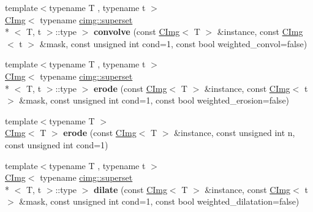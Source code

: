 \begin{DoxyCompactItemize}
\item 
\hypertarget{namespacecimg__library_ac7712bb68aca4c24eea108d6dbde8194}{{\footnotesize template$<$typename T , typename t $>$ }\\\hyperlink{structcimg__library_1_1_c_img}{C\-Img}$<$ typename \hyperlink{structcimg__library_1_1cimg_1_1superset}{cimg\-::superset}\\*
$<$ T, t $>$\-::type $>$ {\bfseries convolve} (const \hyperlink{structcimg__library_1_1_c_img}{C\-Img}$<$ T $>$ \&instance, const \hyperlink{structcimg__library_1_1_c_img}{C\-Img}$<$ t $>$ \&mask, const unsigned int cond=1, const bool weighted\-\_\-convol=false)}\label{namespacecimg__library_ac7712bb68aca4c24eea108d6dbde8194}

\item 
\hypertarget{namespacecimg__library_a6ae77a10d78e14a71801275d62aa927f}{{\footnotesize template$<$typename T , typename t $>$ }\\\hyperlink{structcimg__library_1_1_c_img}{C\-Img}$<$ typename \hyperlink{structcimg__library_1_1cimg_1_1superset}{cimg\-::superset}\\*
$<$ T, t $>$\-::type $>$ {\bfseries erode} (const \hyperlink{structcimg__library_1_1_c_img}{C\-Img}$<$ T $>$ \&instance, const \hyperlink{structcimg__library_1_1_c_img}{C\-Img}$<$ t $>$ \&mask, const unsigned int cond=1, const bool weighted\-\_\-erosion=false)}\label{namespacecimg__library_a6ae77a10d78e14a71801275d62aa927f}

\item 
\hypertarget{namespacecimg__library_a680ec2caf5175dc764d0fa4d8b2295bd}{{\footnotesize template$<$typename T $>$ }\\\hyperlink{structcimg__library_1_1_c_img}{C\-Img}$<$ T $>$ {\bfseries erode} (const \hyperlink{structcimg__library_1_1_c_img}{C\-Img}$<$ T $>$ \&instance, const unsigned int n, const unsigned int cond=1)}\label{namespacecimg__library_a680ec2caf5175dc764d0fa4d8b2295bd}

\item 
\hypertarget{namespacecimg__library_a42d9fbad3862204cdb5461382c2fb263}{{\footnotesize template$<$typename T , typename t $>$ }\\\hyperlink{structcimg__library_1_1_c_img}{C\-Img}$<$ typename \hyperlink{structcimg__library_1_1cimg_1_1superset}{cimg\-::superset}\\*
$<$ T, t $>$\-::type $>$ {\bfseries dilate} (const \hyperlink{structcimg__library_1_1_c_img}{C\-Img}$<$ T $>$ \&instance, const \hyperlink{structcimg__library_1_1_c_img}{C\-Img}$<$ t $>$ \&mask, const unsigned int cond=1, const bool weighted\-\_\-dilatation=false)}\label{namespacecimg__library_a42d9fbad3862204cdb5461382c2fb263}


\end{DoxyCompactItemize}
